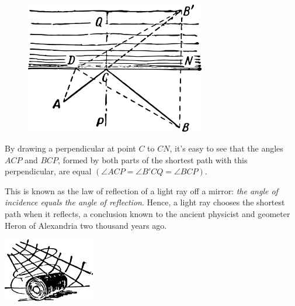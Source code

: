 \begin{figure}%
\centering
\includegraphics[width=0.7\textwidth]{figures/ch-12/fig-192.pdf}
\end{figure}


By drawing a perpendicular at point $C$ to $CN$, it's easy to see that the angles $ACP$ and $BCP$, formed by both parts of the shortest path with this perpendicular, are equal $(\angle ACP = \angle B'CQ = \angle  BCP)$.

This is known as the law of reflection of a light ray off a mirror: \emph{the angle of incidence equals the angle of reflection}. Hence, a light ray chooses the shortest path when it reflects, a conclusion known to the ancient physicist and geometer Heron of Alexandria two thousand years ago.




\begin{center}
\includegraphics[width=0.3\textwidth]{figures/ch-11/fig-ch-11-tail.pdf}\\[20pt]


\end{center}


















